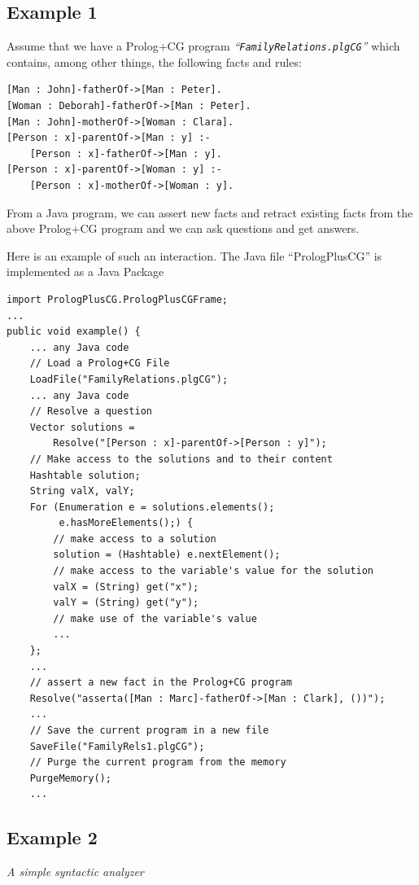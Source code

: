 \documentclass{book}
\begin{document}
\subsection{Example 1}

Assume that we have a Prolog+CG program
{\it ``\texttt{FamilyRelations.plgCG}''} which contains, among other things,
the following facts and rules:


\begin{verbatim}
[Man : John]-fatherOf->[Man : Peter].
[Woman : Deborah]-fatherOf->[Man : Peter].
[Man : John]-motherOf->[Woman : Clara].
[Person : x]-parentOf->[Man : y] :-
    [Person : x]-fatherOf->[Man : y].
[Person : x]-parentOf->[Woman : y] :-
    [Person : x]-motherOf->[Woman : y].
\end{verbatim}


From a Java program, we can assert new facts and
retract existing facts from the above Prolog+CG program and we can
ask questions and get answers.

Here is an example of such an interaction. The
Java file ``PrologPlusCG''
is implemented as a Java Package


\begin{verbatim}
import PrologPlusCG.PrologPlusCGFrame;
...
public void example() {
    ... any Java code
    // Load a Prolog+CG File
    LoadFile("FamilyRelations.plgCG");
    ... any Java code
    // Resolve a question
    Vector solutions = 
        Resolve("[Person : x]-parentOf->[Person : y]");
    // Make access to the solutions and to their content
    Hashtable solution;
    String valX, valY;
    For (Enumeration e = solutions.elements(); 
         e.hasMoreElements();) {
        // make access to a solution
        solution = (Hashtable) e.nextElement();
        // make access to the variable's value for the solution
        valX = (String) get("x");
        valY = (String) get("y");
        // make use of the variable's value
        ...
    };
    ...
    // assert a new fact in the Prolog+CG program
    Resolve("asserta([Man : Marc]-fatherOf->[Man : Clark], ())");
    ...
    // Save the current program in a new file
    SaveFile("FamilyRels1.plgCG");
    // Purge the current program from the memory
    PurgeMemory();
    ...
\end{verbatim}


\subsection{Example 2} 

{\it A simple syntactic analyzer}
\end{document}
